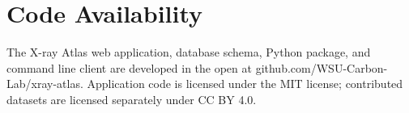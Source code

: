 \section{Code Availability}\label{sec:code-availability}

The X-ray Atlas web application, database schema, Python package, and command line client are developed in the open at github.com/WSU-Carbon-Lab/xray-atlas. Application code is licensed under the MIT license; contributed datasets are licensed separately under CC BY 4.0.
